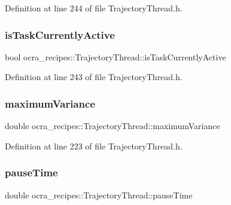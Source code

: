 Definition at line 244 of file Trajectory\+Thread.\+h.

\hypertarget{classocra__recipes_1_1TrajectoryThread_a7f185a5b52a00b7e5bce78e5ffb77d97}{}\label{classocra__recipes_1_1TrajectoryThread_a7f185a5b52a00b7e5bce78e5ffb77d97} 
\subsubsection{\texorpdfstring{is\+Task\+Currently\+Active}{isTaskCurrentlyActive}}
{\footnotesize\ttfamily bool ocra\+\_\+recipes\+::\+Trajectory\+Thread\+::is\+Task\+Currently\+Active\hspace{0.3cm}{\ttfamily [protected]}}



Definition at line 243 of file Trajectory\+Thread.\+h.

\hypertarget{classocra__recipes_1_1TrajectoryThread_a16c8d8bfbbfb45b1a3fa9b08781123aa}{}\label{classocra__recipes_1_1TrajectoryThread_a16c8d8bfbbfb45b1a3fa9b08781123aa} 
\subsubsection{\texorpdfstring{maximum\+Variance}{maximumVariance}}
{\footnotesize\ttfamily double ocra\+\_\+recipes\+::\+Trajectory\+Thread\+::maximum\+Variance\hspace{0.3cm}{\ttfamily [protected]}}



Definition at line 223 of file Trajectory\+Thread.\+h.

\hypertarget{classocra__recipes_1_1TrajectoryThread_a9436d523ebb66dfa9bbc8ed458306e46}{}\label{classocra__recipes_1_1TrajectoryThread_a9436d523ebb66dfa9bbc8ed458306e46} 
\subsubsection{\texorpdfstring{pause\+Time}{pauseTime}}
{\footnotesize\ttfamily double ocra\+\_\+recipes\+::\+Trajectory\+Thread\+::pause\+Time\hspace{0.3cm}{\ttfamily [protected]}}



